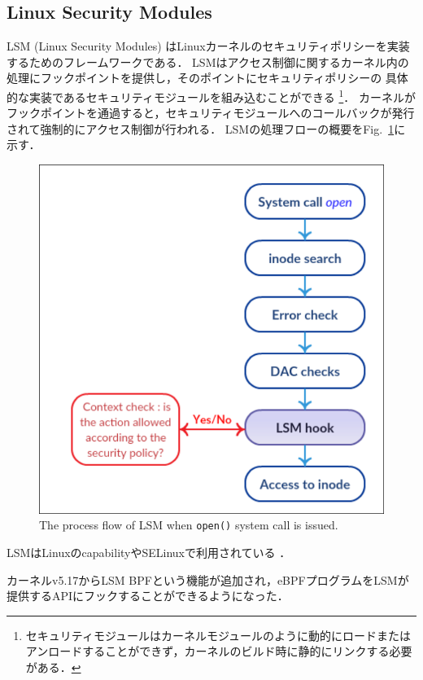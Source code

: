\documentclass[platex,a4j,10pt,twoside,twocolumn,dvipdfmx]{jsarticle}
\newcommand{\Fref}[1]{Fig.~\ref{#1}}
\begin{document}
  \subsection{Linux Security Modules}
  LSM (Linux Security Modules) はLinuxカーネルのセキュリティポリシーを実装するためのフレームワークである．
  LSMはアクセス制御に関するカーネル内の処理にフックポイントを提供し，そのポイントにセキュリティポリシーの
  具体的な実装であるセキュリティモジュールを組み込むことができる
  \footnote{セキュリティモジュールはカーネルモジュールのように動的にロードまたはアンロードすることができず，カーネルのビルド時に静的にリンクする必要がある．}．
  カーネルがフックポイントを通過すると，セキュリティモジュールへのコールバックが発行されて強制的にアクセス制御が行われる．
  LSMの処理フローの概要を\Fref{img:lsm-process}に示す．
  \begin{figure}[tp]
    \begin{center}
      \includegraphics[width=\columnwidth]{./img/lsm-stack-hooks.png}
    \end{center}
    \caption{The process flow of LSM when \texttt{open()} system call is issued. \cite{LinuxSec12:online}}
    \label{img:lsm-process}
  \end{figure}
  LSMはLinuxのcapabilityやSELinuxで利用されている \cite{LinuxSec95:online}．
  
  カーネルv5.17からLSM BPFという機能が追加され，eBPFプログラムをLSMが提供するAPIにフックすることができるようになった．
  
\end{document}
